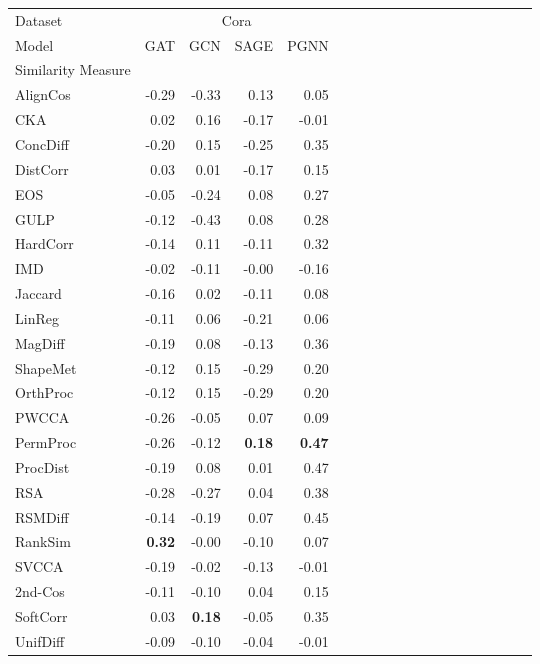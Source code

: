 \begin{tabular}{l||rrr|rrr|rrr||rrr|rrr|rrr}
\toprule
Dataset & \multicolumn{4}{c}{Cora} \\
Model & GAT & GCN & SAGE & PGNN \\
Similarity Measure &  &  &  &  \\
\midrule
AlignCos & -0.29 & -0.33 & 0.13 & 0.05 \\
CKA & 0.02 & 0.16 & -0.17 & -0.01 \\
ConcDiff & -0.20 & 0.15 & -0.25 & 0.35 \\
DistCorr & 0.03 & 0.01 & -0.17 & 0.15 \\
EOS & -0.05 & -0.24 & 0.08 & 0.27 \\
GULP & -0.12 & -0.43 & 0.08 & 0.28 \\
HardCorr & -0.14 & 0.11 & -0.11 & 0.32 \\
IMD & -0.02 & -0.11 & -0.00 & -0.16 \\
Jaccard & -0.16 & 0.02 & -0.11 & 0.08 \\
LinReg & -0.11 & 0.06 & -0.21 & 0.06 \\
MagDiff & -0.19 & 0.08 & -0.13 & 0.36 \\
ShapeMet & -0.12 & 0.15 & -0.29 & 0.20 \\
OrthProc & -0.12 & 0.15 & -0.29 & 0.20 \\
PWCCA & -0.26 & -0.05 & 0.07 & 0.09 \\
PermProc & -0.26 & -0.12 & \textbf{0.18} & \textbf{0.47} \\
ProcDist & -0.19 & 0.08 & 0.01 & 0.47 \\
RSA & -0.28 & -0.27 & 0.04 & 0.38 \\
RSMDiff & -0.14 & -0.19 & 0.07 & 0.45 \\
RankSim & \textbf{0.32} & -0.00 & -0.10 & 0.07 \\
SVCCA & -0.19 & -0.02 & -0.13 & -0.01 \\
2nd-Cos & -0.11 & -0.10 & 0.04 & 0.15 \\
SoftCorr & 0.03 & \textbf{0.18} & -0.05 & 0.35 \\
UnifDiff & -0.09 & -0.10 & -0.04 & -0.01 \\
\bottomrule
\end{tabular}

